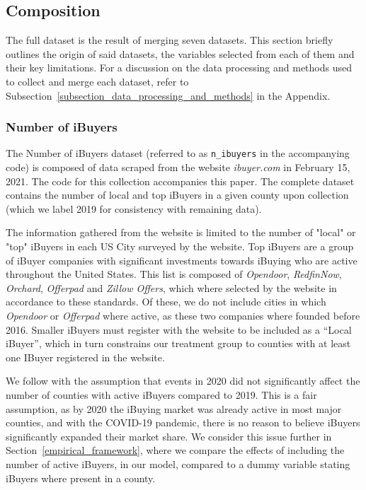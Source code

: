 \subsection{Composition}\label{subsection_composition}
The full dataset is the result of merging seven datasets. This section briefly outlines the origin of said datasets, the variables selected from each of them and their key limitations. For a discussion on the data processing and methods used to collect and merge each dataset, refer to Subsection~\ref{subsection_data_processing_and_methods} in the Appendix.

\subsubsection{Number of iBuyers}\label{subsubsec_n_ibuyers}
The Number of iBuyers dataset (referred to as \lstinline{n_ibuyers} in the accompanying code) is composed of data scraped from the website \textit{ibuyer.com}\cite{iBuyer} in February 15, 2021. The code for this collection accompanies this paper. The complete dataset contains the number of local and top iBuyers in a given county upon collection (which we label 2019 for consistency with remaining data). 

The information gathered from the website is limited to the number of "local" or "top" iBuyers in each US City surveyed by the website. Top iBuyers are a group of iBuyer companies with significant investments towards iBuying who are active throughout the United States. This list is composed of \textit{Opendoor}, \textit{RedfinNow}, \textit{Orchard}, \textit{Offerpad} and \textit{Zillow Offers}, which where selected by the website in accordance to these standards. Of these, we do not include cities in which \textit{Opendoor} or \textit{Offerpad} where active, as these two companies where founded before 2016. Smaller iBuyers must register with the website to be included as a ``Local iBuyer'', which in turn constrains our treatment group to counties with at least one IBuyer registered in the website. 

We follow with the assumption that events in 2020 did not significantly affect the number of counties with active iBuyers compared to 2019. This is a fair assumption, as by 2020 the iBuying market was already active in most major counties, and with the COVID-19 pandemic, there is no reason to believe iBuyers significantly expanded their market share. We consider this issue further in Section~\ref{empirical_framework}, where we compare the effects of including the number of active iBuyers, in our model, compared to a dummy variable stating iBuyers where present in a county.

